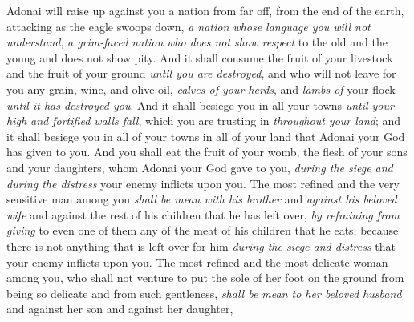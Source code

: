 \begin{biblechapter}
\verse Adonai will raise up against you a nation from far off, from the end of the earth, attacking as the eagle swoops down, \textit{a nation whose language you will not understand},
\verse \textit{a grim-faced nation} \textit{who does not show respect} to the old and the young and does not show pity.
\verse And it shall consume the fruit of your livestock and the fruit of your ground \textit{until you are destroyed}, and who will not leave for you any grain, wine, and olive oil, \textit{calves of your herds}, and \textit{lambs of} your flock \textit{until it has destroyed you}.
\verse And it shall besiege you in all your towns \textit{until your high and fortified walls fall}, which you are trusting in \textit{throughout your land}; and it shall besiege you in all of your towns in all of your land that Adonai your God has given to you.
\verse And you shall eat the fruit of your womb, the flesh of your sons and your daughters, whom Adonai your God gave to you, \textit{during the siege and during the distress} your enemy inflicts upon you.
\verse The most refined and the very sensitive man among you \textit{shall be mean with his brother} and \textit{against his beloved wife} and against the rest of his children that he has left over,
\verse \textit{by refraining from giving} to even one of them any of the meat of his children that he eats, because there is not anything that is left over for him \textit{during the siege and distress} that your enemy inflicts upon you.
\verse The most refined and the most delicate woman among you, who shall not venture to put the sole of her foot on the ground from being so delicate and from such gentleness, \textit{shall be mean to her beloved husband} and against her son and against her daughter,

\end{biblechapter}
